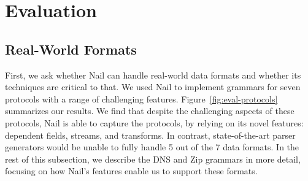 \section{Evaluation}
\label{s:eval}








\subsection{Real-World Formats}
\label{s:eval-formats}

First, we ask whether Nail can handle real-world data formats and whether its techniques are
critical to that. We used Nail to implement grammars
for seven protocols with a range of challenging features.
Figure~\ref{fig:eval-protocols} summarizes our results.
We find that despite the challenging aspects of these protocols, Nail is
able to capture the protocols, by relying on its novel features: dependent
fields, streams, and transforms.  In contrast, state-of-the-art parser
generators would be unable to fully handle 5 out of the 7 data formats.
In the rest of this subsection, we describe the DNS and Zip grammars in
more detail, focusing on how Nail's features enable us to support these
formats.

